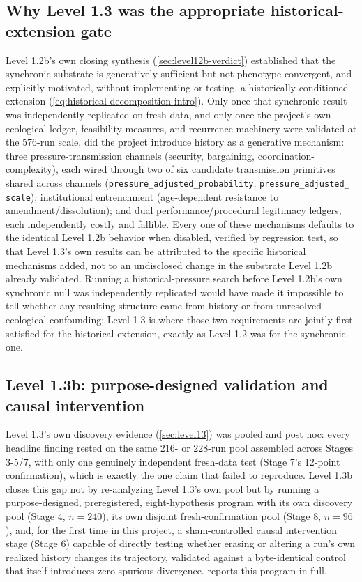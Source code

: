 \subsection{Why Level 1.3 was the appropriate historical-extension gate}
\label{sec:why-level13}

Level 1.2b's own closing synthesis (\cref{sec:level12b-verdict}) established
that the synchronic substrate is generatively sufficient but not
phenotype-convergent, and explicitly motivated, without implementing or
testing, a historically conditioned extension
(\cref{eq:historical-decomposition-intro}). Only once that synchronic
result was independently replicated on fresh data, and only once the
project's own ecological ledger, feasibility measures, and recurrence
machinery were validated at the 576-run scale, did the project introduce
history as a generative mechanism: three pressure-transmission channels
(security, bargaining, coordination-complexity), each wired through two of
six candidate transmission primitives shared across channels
(\texttt{pressure\_adjusted\_probability}, \texttt{pressure\_adjusted\_%
scale}); institutional entrenchment (age-dependent resistance to
amendment/dissolution); and dual performance/procedural legitimacy ledgers,
each independently costly and fallible. Every one of these mechanisms
defaults to the identical Level 1.2b behavior when disabled, verified by
regression test, so that Level 1.3's own results can be attributed to the
specific historical mechanisms added, not to an undisclosed change in the
substrate Level 1.2b already validated. Running a historical-pressure
search before Level 1.2b's own synchronic null was independently replicated
would have made it impossible to tell whether any resulting structure came
from history or from unresolved ecological confounding; Level 1.3 is where
those two requirements are jointly first satisfied for the historical
extension, exactly as Level 1.2 was for the synchronic one.

\subsection{Level 1.3b: purpose-designed validation and causal intervention}
\label{sec:why-level13b}

Level 1.3's own discovery evidence (\cref{sec:level13}) was pooled and
post hoc: every headline finding rested on the same 216- or 228-run pool
assembled across Stages 3-5/7, with only one genuinely independent
fresh-data test (Stage 7's 12-point confirmation), which is exactly the one
claim that failed to reproduce. Level 1.3b closes this gap not by
re-analyzing Level 1.3's own pool but by running a purpose-designed,
preregistered, eight-hypothesis program with its own discovery pool
(Stage 4, $n=240$), its own disjoint fresh-confirmation pool (Stage 8,
$n=96$), and, for the first time in this project, a sham-controlled causal
intervention stage (Stage 6) capable of directly testing whether erasing or
altering a run's own realized history changes its trajectory, validated
against a byte-identical control that itself introduces zero spurious
divergence.  reports this program in full.
